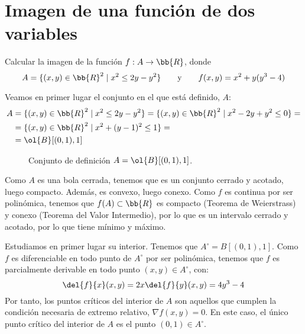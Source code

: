 \section{Imagen de una función de dos variables}

\begin{ejercicio}
    Calcular la imagen de la función $f: A \to \bb{R}$, donde
    \begin{equation*}
        A = \{(x,y)\in \bb{R}^2\mid x^2\leq 2y-y^2\}
        \qquad \text{y} \qquad
        f(x,y)=x^2+y(y^3-4)
    \end{equation*}

    Veamos en primer lugar el conjunto en el que está definido, $A$:
    \begin{equation*}
        \begin{split}
            A &= \{(x,y)\in \bb{R}^2\mid x^2\leq 2y-y^2\}
            = \{(x,y)\in \bb{R}^2\mid x^2- 2y+y^2\leq 0\} =\\
            &= \{(x,y)\in \bb{R}^2\mid x^2 + (y-1)^2\leq 1\} =\\
            &= \ol{B}[(0,1),1]
        \end{split}
    \end{equation*}
    \begin{figure}[H]
        \centering
        \caption{Conjunto de definición $A=\ol{B}[(0,1),1]$.}
    \end{figure}

    Como $A$ es una bola cerrada, tenemos que es un conjunto cerrado y acotado, luego compacto. Además, es convexo, luego conexo. Como $f$ es continua por ser polinómica, tenemos que $f(A)\subset \bb{R}$ es compacto (Teorema de Weierstrass) y conexo (Teorema del Valor Intermedio), por lo que es un intervalo cerrado y acotado, por lo que tiene mínimo y máximo.

    Estudiamos en primer lugar su interior. Tenemos que $A^\circ = B[(0,1),1]$. Como $f$ es diferenciable en todo punto de $A^\circ$ por ser polinómica, tenemos que $f$ es parcialmente derivable en todo punto $(x,y)\in A^\circ$, con:
    \begin{equation*}
        \del{f}{x}(x,y) = 2x \\
        \del{f}{y}(x,y) = 4y^3-4
    \end{equation*}
    Por tanto, los puntos críticos del interior de $A$ son aquellos que cumplen la condición necesaria de extremo relativo, $\nabla f(x,y)=0$. En este caso, el único punto crítico del interior de $A$ es el punto $(0,1)\in A^\circ$.


\end{ejercicio}
